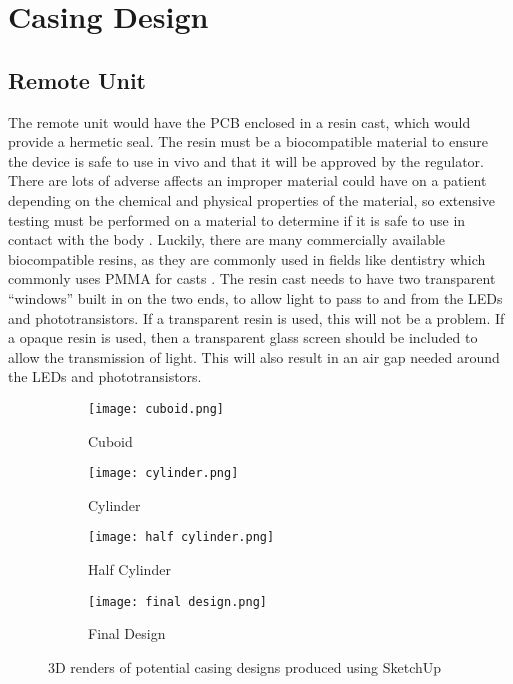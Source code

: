 \section{Casing Design}

\subsection{Remote Unit}
The remote unit would have the PCB enclosed in a resin cast, which would provide a hermetic seal. The resin must be a biocompatible material to ensure the device is safe to use in vivo and that it will be approved by the regulator. There are lots of adverse affects an improper material could have on a patient depending on the chemical and physical properties of the material, so extensive testing must be performed on a material to determine if it is safe to use in contact with the body \cite{biocompatible_tests}. Luckily, there are many commercially available biocompatible resins, as they are commonly used in fields like dentistry which commonly uses PMMA for casts \cite{biocompatible_resin}. The resin cast needs to have two transparent ``windows'' built in on the two ends, to allow light to pass to and from the LEDs and phototransistors. If a transparent resin is used, this will not be a problem. If a opaque resin is used, then a transparent glass screen should be included to allow the transmission of light. This will also result in an air gap needed around the LEDs and phototransistors.\\

\begin{figure}[htbp]
	\centering
	\begin{subfigure}[b]{0.4\linewidth}
		\texttt{[image: cuboid.png]}
		\caption{Cuboid}
		\label{fig: cuboid}
	\end{subfigure}
	\begin{subfigure}[b]{0.4\linewidth}
		\texttt{[image: cylinder.png]}
		\caption{Cylinder}
		\label{fig: cylinder}
	\end{subfigure}
	\begin{subfigure}[b]{0.4\linewidth}
		\texttt{[image: half cylinder.png]}
		\caption{Half Cylinder}
		\label{fig: half cylinder}
	\end{subfigure}
	\begin{subfigure}[b]{0.4\linewidth}
		\texttt{[image: final design.png]}
		\caption{Final Design}
		\label{fig: final design}
	\end{subfigure}
	\caption{3D renders of potential casing designs produced using SketchUp \cite{sketchup}}
	\label{fig: casings}
\end{figure}


